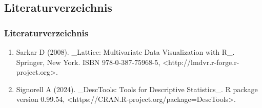 \documentclass{beamer}
\begin{document}
\begin{frame}[noframenumbering]
	\section{Literaturverzeichnis}
	\frametitle{Literaturverzeichnis}
	\begin{enumerate}[]
		\item Sarkar D (2008). \_Lattice: Multivariate Data Visualization with R\_.
		Springer, New York. ISBN 978-0-387-75968-5,
		<http://lmdvr.r-forge.r-project.org>.
		\item Signorell A (2024). \_DescTools: Tools for Descriptive Statistics\_. R package
		version 0.99.54, <https://CRAN.R-project.org/package=DescTools>.
	\end{enumerate}
	
\end{frame}
\end{document}
